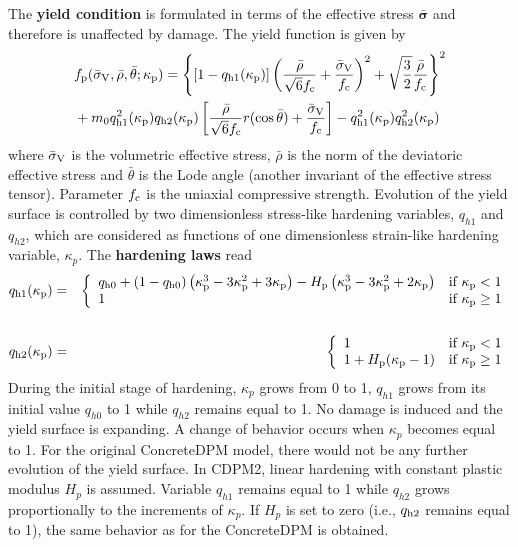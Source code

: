 \documentclass[a4paper]{article}
\begin{document}
The {\bf yield condition} is formulated in terms of the effective
stress $\bar{\boldsymbol{\sigma}}$ and therefore is unaffected by damage.
The yield function is given by
\begin{equation} \label{eqcdpm2:yieldSurface}    
\begin{split}
& f_{\rm p}(\bar{\sigma}_{\rm V},\bar\rho,\bar\theta;\kappa_{\rm p})=  \left\{\left[1-q_{\rm{h1}}(\kappa_{\rm p})\right]\left( \frac{\bar{\rho}} {\sqrt{6}f_{\rm c}} + \frac{\bar{\sigma}_{\rm V}} {f_{\rm c}} \right)^2 + \sqrt{\frac{3}{2}} \frac {\bar{\rho}}{f_{\rm c}} \right\}^2 \\
& +m_0 q^2_{\rm{h1}}(\kappa_{\rm p})q_{\rm{h2}}(\kappa_{\rm p}) \left[\frac{\bar{\rho} }{\sqrt{6}f_{\rm c}}r(\cos{\bar{\theta}}) + \frac{\bar{\sigma}_{\rm V}}{f_{\rm c}} \right] - q_{\rm{h1}}^2(\kappa_{\rm p}) q_{{\rm h2}}^2(\kappa_{\rm p})
\end{split}
\end{equation}
where $\bar\sigma_{\rm V}$ is the volumetric effective stress, $\bar\rho$ is the norm of the deviatoric effective stress
and $\bar\theta$ is the Lode angle (another invariant of the effective
stress tensor).
Parameter $f_{\rm c}$ is the uniaxial compressive strength.
Evolution of the
yield surface is controlled by two dimensionless stress-like hardening variables,
$q_{h1}$ and $q_{h2}$, which are considered as functions of one
dimensionless strain-like hardening variable, $\kappa_p$.
The {\bf hardening laws} read
\begin{eqnarray} \nonumber
q_{\rm h1}(\kappa_{\rm p}) &=& 
\left \{ \begin{array}{ll} q_{\rm h0} + \left(1-q_{\rm h0}\right) \left( \kappa_{\rm p}^3 - 3 \kappa_{\rm p}^2 + 3 \kappa_{\rm p} \right) - H_{\rm p} \left(\kappa_{\rm p}^3 - 3 \kappa_{\rm p}^2 + 2 \kappa_{\rm p}\right) & \mbox{if $\kappa_{\rm p} < 1$} \\
1 & \mbox{if $\kappa_{\rm p} \ge 1$}
\end{array}
\right.
\\ \label{eq:hardeningLawOne} \\ 
q_{\rm h2}(\kappa_{\rm p}) &=& \left \{ \begin{array}{ll} 1 & \mbox{if $\kappa_{\rm p} < 1$} \\
1 + H_{\rm p} (\kappa_{\rm p} - 1)  & \mbox{if $\kappa_{\rm p} \ge 1$}
\end{array}
\right.
\label{eq:hardeningLawTwo}
\end{eqnarray}
During the initial stage of
hardening, $\kappa_p$ grows from 0 to 1, $q_{h1}$ grows from
its initial value $q_{h0}$ to 1 while $q_{h2}$ remains equal to 1.
No damage is induced and the yield surface is expanding. A change
of behavior occurs when $\kappa_p$ becomes equal to 1. For the
original ConcreteDPM model, there would not be any further evolution
of the yield surface. In CDPM2, linear hardening with constant
plastic modulus $H_p$ is assumed. Variable $q_{h1}$ remains equal to 1
while $q_{h2}$ grows proportionally to the increments of $\kappa_p$.
If $H_p$ is set to zero (i.e., $q_{\rm h2}$ remains equal to 1),
the same behavior as for the ConcreteDPM is obtained.
\end{document}
